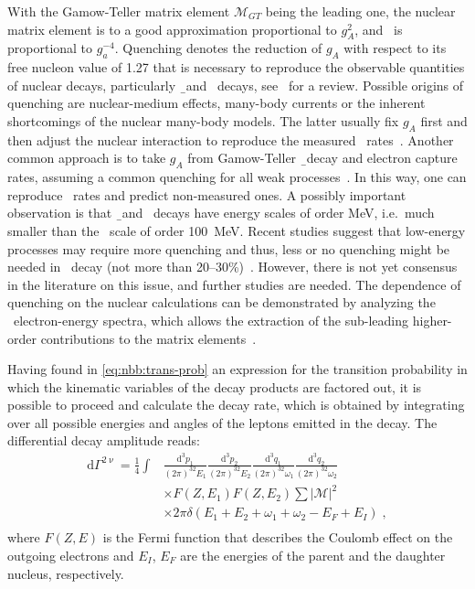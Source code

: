 With the Gamow-Teller matrix element $\mathcal{M}_{GT}$ being the leading one, the nuclear
matrix element is to a good approximation proportional to $g_A^2$, and \thalftwo\ is
proportional to $g_a^{-4}$. Quenching denotes the reduction of $g_A$ with respect to its
free nucleon value of 1.27 that is necessary to reproduce the observable quantities of
nuclear decays, particularly \b\ and \nnbb\ decays, see~\cite{Suhonen2017} for a review.
Possible origins of quenching are nuclear-medium effects, many-body currents or the
inherent shortcomings of the nuclear many-body models. The latter usually fix $g_A$ first
and then adjust the nuclear interaction to reproduce the measured \nnbb\ rates~\cite{?}. Another
common approach is to take $g_A$ from Gamow-Teller \b\ decay and electron capture rates,
assuming a common quenching for all weak processes~\cite{?}. In this way, one can reproduce \nnbb\
rates and predict non-measured ones. A possibly important observation is that \b\ and
\nnbb\ decays have energy scales of order MeV, i.e.~much smaller than the \onbb\ scale of
order 100~MeV. Recent studies suggest that low-energy processes may require more quenching
and thus, less or no quenching might be needed in \onbb\ decay (not more than 20--30\%)~\cite{?}.
However, there is not yet consensus in the literature on this issue, and further studies
are needed. The dependence of quenching on the nuclear calculations can be demonstrated by
analyzing the \nnbb\ electron-energy spectra, which allows the extraction of the
sub-leading higher-order contributions to the matrix elements~\cite{Gando2019}.

Having found in \cref{eq:nbb:trans-prob} an expression for the transition probability in
which the kinematic variables of the decay products are factored out, it is possible to
proceed and calculate the decay rate, which is obtained by integrating over all possible
energies and angles of the leptons emitted in the decay.  The differential decay amplitude
reads:
\[
  \begin{split}
    \text{d}\Gamma^{2\upnu} =
      \frac{1}{4} \int & \frac{\text{d}^3p_1}{(2\pi)^32E_1}
                         \frac{\text{d}^3p_2}{(2\pi)^32E_2}
                         \frac{\text{d}^3q_1}{(2\pi)^32\omega_1}
                         \frac{\text{d}^3q_2}{(2\pi)^32\omega_2} \\
                       & \times F(Z,E_1) F(Z,E_2) \sum |\mathcal{M}|^2 \\
                       & \times 2\pi\delta (E_1 + E_2 + \omega_1 +
                         \omega_2 - E_F + E_I) \;, \\
  \end{split}
\]
where $F(Z,E)$ is the Fermi function that describes the Coulomb effect on the outgoing
electrons and $E_I$, $E_F$ are the energies of the parent and the daughter nucleus,
respectively.

